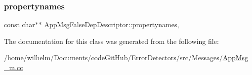 \subsubsection{\texorpdfstring{propertynames}{propertynames}}
{\footnotesize\ttfamily const char$\ast$$\ast$ App\+Msg\+False\+Dep\+Descriptor\+::propertynames\hspace{0.3cm}{\ttfamily [mutable]}, {\ttfamily [private]}}



The documentation for this class was generated from the following file\+:\begin{DoxyCompactItemize}
\item 
/home/wilhelm/\+Documents/code\+Git\+Hub/\+Error\+Detectors/src/\+Messages/\hyperlink{_app_msg__m_8cc}{App\+Msg\+\_\+m.\+cc}\end{DoxyCompactItemize}
